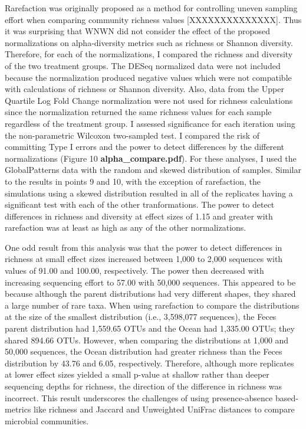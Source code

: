 \documentclass[
]{article}
\begin{document}
Rarefaction was originally proposed as a method for controlling uneven
sampling effort when comparing community richness values
{[}XXXXXXXXXXXXXX{]}. Thus it was surprising that WNWN did not consider
the effect of the proposed normalizations on alpha-diversity metrics
such as richness or Shannon diversity. Therefore, for each of the
normalizations, I compared the richness and diversity of the two
treatment groups. The DESeq normalized data were not included because
the normalization produced negative values which were not compatible
with calculations of richness or Shannon diversity. Also, data from the
Upper Quartile Log Fold Change normalization were not used for richness
calculations since the normalization returned the same richness values
for each sample regardless of the treatment group. I assessed
significance for each iteration using the non-parametric Wilcoxon
two-sampled test. I compared the risk of committing Type I errors and
the power to detect differences by the different normalizations (Figure
10 \textbf{alpha\_compare.pdf}). For these analyses, I used the
GlobalPatterns data with the random and skewed distribution of samples.
Similar to the results in points 9 and 10, with the exception of
rarefaction, the simulations using a skewed distribution resulted in all
of the replicates having a significant test with each of the other
tranformations. The power to detect differences in richness and
diversity at effect sizes of 1.15 and greater with rarefaction was at
least as high as any of the other normalizations.

One odd result from this analysis was that the power to detect
differences in richness at small effect sizes increased between 1,000 to
2,000 sequences with values of 91.00 and 100.00, respectively. The power
then decreased with increasing sequencing effort to 57.00 with 50,000
sequences. This appeared to be because although the parent distributions
had very different shapes, they shared a large number of rare taxa. When
using rarefaction to compare the distributions at the size of the
smallest distribution (i.e., 3,598,077 sequences), the Feces parent
distribution had 1,559.65 OTUs and the Ocean had 1,335.00 OTUs; they
shared 894.66 OTUs. However, when comparing the distributions at 1,000
and 50,000 sequences, the Ocean distribution had greater richness than
the Feces distribution by 43.76 and 6.05, respectively. Therefore,
although more replicates at lower effect sizes yielded a small p-value
at shallow rather than deeper sequencing depths for richness, the
direction of the difference in richness was incorrect. This result
underscores the challenges of using presence-absence based-metrics like
richness and Jaccard and Unweighted UniFrac distances to compare
microbial communities.
\end{document}
